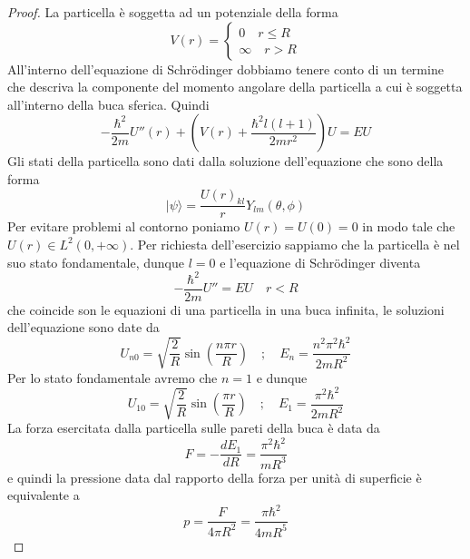 \begin{proof}
	La particella \`e soggetta ad un potenziale della forma 
	\begin{equation*}
		V(r) = \left \{ \begin{array}{l}
			0 \quad r \leq R \\
			\infty \quad r > R
		\end{array}\right.
	\end{equation*}
All'interno dell'equazione di Schr\"odinger dobbiamo tenere conto di un termine che descriva la componente del momento angolare della particella a cui \`e soggetta all'interno della buca sferica. Quindi
\begin{equation*}
	-\frac{\hbar^2}{2m}U''(r) + \left ( V(r) + \frac{\hbar^2 l(l+1)}{2mr^2}\right)U = EU
\end{equation*}
Gli stati della particella sono dati dalla soluzione dell'equazione che sono della forma 
\begin{equation*}
	|\psi \rangle = \frac{U(r)_{kl}}{r} Y_{lm}(\theta,\phi)
\end{equation*}
Per evitare problemi al contorno poniamo $U(r) = U(0) = 0$ in modo tale che $U(r) \in L^2(0,+\infty)$. Per richiesta dell'esercizio sappiamo che la particella \`e nel suo stato fondamentale, dunque $l = 0$ e l'equazione di Schr\"odinger diventa
\begin{equation*}
	-\frac{\hbar^2}{2m}U'' = EU \quad r < R
\end{equation*}
che coincide son le equazioni di una particella in una buca infinita, le soluzioni dell'equazione sono date da 
\begin{equation*}
	U_{n0} = \sqrt{\frac{2}{R}} \sin \left( \frac{n\pi r}{R}\right) \quad ; \quad E_{n} = \frac{n^2 \pi^2 \hbar^2}{2mR^2}
\end{equation*} 
Per lo stato fondamentale avremo che $n=1$ e dunque 
\begin{equation*}
		U_{10} = \sqrt{\frac{2}{R}} \sin \left( \frac{\pi r}{R}\right) \quad ; \quad E_{1} = \frac{ \pi^2 \hbar^2}{2mR^2}
\end{equation*}
La forza esercitata dalla particella sulle pareti della buca \`e data da
\begin{equation*}
	F = - \frac{dE_1}{dR} = \frac{\pi^2 \hbar^2}{mR^3} 
\end{equation*}
e quindi la pressione data dal rapporto della forza per unit\`a di superficie \`e equivalente a 
\begin{equation*}
	p = \frac{F}{4\pi R^2} =  \frac{\pi \hbar^2}{4mR^5}
\end{equation*}

\end{proof}

